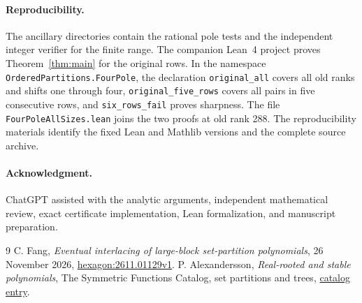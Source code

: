 \documentclass[11pt]{article}
\begin{document}
\paragraph{Reproducibility.}
The ancillary directories contain the rational pole tests and
the independent integer verifier for the finite range.
The companion Lean~4 project proves Theorem~\ref{thm:main} for
the original rows. In the namespace
\texttt{OrderedPartitions.FourPole}, the declaration
\texttt{original\_all} covers all old ranks and shifts one through
four, \texttt{original\_five\_rows} covers all pairs in five
consecutive rows, and \texttt{six\_rows\_fail} proves sharpness.
The file \texttt{FourPoleAllSizes.lean} joins the two proofs at
old rank 288. The reproducibility materials identify the fixed Lean
and Mathlib versions and the complete source archive.

\paragraph{Acknowledgment.}
ChatGPT assisted with the analytic arguments, independent
mathematical review, exact certificate implementation, Lean
formalization, and manuscript preparation.

\begin{thebibliography}{9}
C. Fang, \emph{Eventual interlacing of large-block set-partition
polynomials}, 26 November 2026,
\href{https://hexagonmath.org/2611.01129v1}{hexagon:2611.01129v1}.
P. Alexandersson, \emph{Real-rooted and stable polynomials},
The Symmetric Functions Catalog, set partitions and trees,
\href{https://www.symmetricfunctions.com/realRootedOpenProblems.htm\#set-partitions-and-trees}{catalog entry}.
\end{thebibliography}
\end{document}
